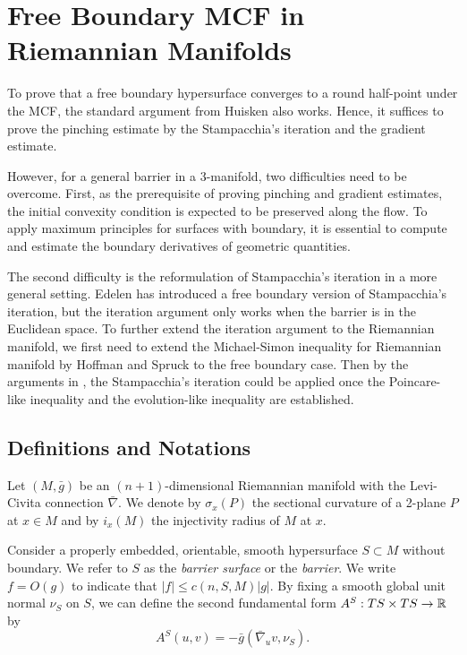 %

\chapter{Free Boundary MCF in Riemannian Manifolds}

To prove that a free boundary hypersurface converges to a round half-point under the MCF, the standard argument from Huisken \cite{huisken_flow_1984} also works. Hence, it suffices to prove the pinching estimate by the Stampacchia's iteration and the gradient estimate. 

However, for a general barrier in a 3-manifold, two difficulties need to be overcome. First, as the prerequisite of proving pinching and gradient estimates, the initial convexity condition is expected to be preserved along the flow. To apply maximum principles for surfaces with boundary, it is essential to compute and estimate the boundary derivatives of geometric quantities.

The second difficulty is the reformulation of Stampacchia's iteration in a more general setting. Edelen \cite{edelen_convexity_2016} has introduced a free boundary version of Stampacchia's iteration, but the iteration argument only works when the barrier is in the Euclidean space. To further extend the iteration argument to the Riemannian manifold, we first need to extend the Michael-Simon inequality for Riemannian manifold by Hoffman and Spruck \cite{hoffman_sobolev_1974} to the free boundary case. Then by the arguments in \cite{edelen_convexity_2016}, the Stampacchia's iteration could be applied once the Poincare-like inequality and the evolution-like inequality are established.

\section{Definitions and Notations}

Let $(M, \bar{g})$ be an $(n+1)$-dimensional Riemannian manifold with the Levi-Civita connection $\bar{\nabla }$. We denote by $\sigma _x(P)$ the sectional curvature of a 2-plane $P$ at $x \in M$ and by $i_x(M)$ the injectivity radius of $M$ at $x$. 

Consider a properly embedded, orientable, smooth hypersurface $S \subset M$ without boundary. We refer to $S$ as the \textit{barrier surface} or the \textit{barrier}. We write $f=O(g)$ to indicate that $\left| f \right| \leq c(n,S,M)\left| g \right| $. By fixing a smooth global unit normal $\nu _S$ on $S$, we can define the second fundamental form $A^S: TS \times TS \to \mathbb{R}$ by
\[A^S(u,v)=-\bar{g}(\bar{\nabla }_u v, \nu _S).\]

